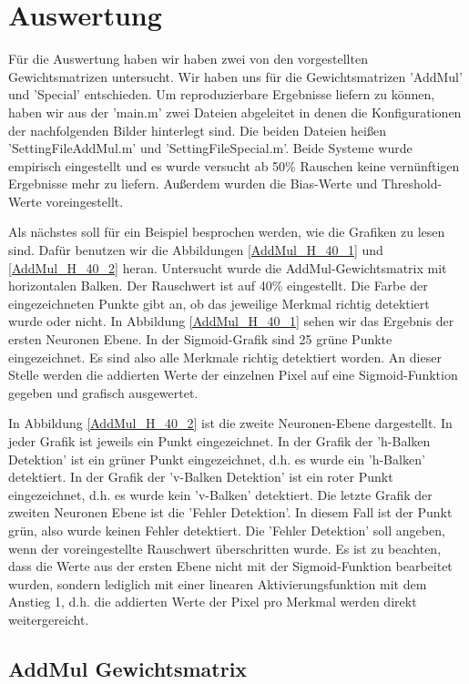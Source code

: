 \newpage
\section{Auswertung}
Für die Auswertung haben wir haben zwei von den vorgestellten Gewichtsmatrizen untersucht. Wir haben uns für die Gewichtsmatrizen 'AddMul' und 'Special' entschieden. Um reproduzierbare Ergebnisse liefern zu können, haben wir aus der 'main.m' zwei Dateien abgeleitet in denen die Konfigurationen der nachfolgenden Bilder hinterlegt sind. Die beiden Dateien heißen 'SettingFileAddMul.m' und 'SettingFileSpecial.m'. Beide Systeme wurde empirisch eingestellt und es wurde versucht ab 50\% Rauschen keine vernünftigen Ergebnisse mehr zu liefern. Außerdem wurden die Bias-Werte und Threshold-Werte voreingestellt.

Als nächstes soll für ein Beispiel besprochen werden, wie die Grafiken zu lesen sind. Dafür benutzen wir die Abbildungen \ref{AddMul_H_40_1} und \ref{AddMul_H_40_2} heran. Untersucht wurde die AddMul-Gewichtsmatrix mit horizontalen Balken. Der Rauschwert ist auf 40\% eingestellt. Die Farbe der eingezeichneten Punkte gibt an, ob das jeweilige Merkmal richtig detektiert wurde oder nicht. In Abbildung \ref{AddMul_H_40_1} sehen wir das Ergebnis der ersten Neuronen Ebene. In der Sigmoid-Grafik sind 25 grüne Punkte eingezeichnet. Es sind also alle Merkmale richtig detektiert worden. An dieser Stelle werden die addierten Werte der einzelnen Pixel auf eine Sigmoid-Funktion gegeben und grafisch ausgewertet.

In Abbildung \ref{AddMul_H_40_2} ist die zweite Neuronen-Ebene dargestellt. In jeder Grafik ist jeweils ein Punkt eingezeichnet. In der Grafik der 'h-Balken Detektion' ist ein grüner Punkt eingezeichnet, d.h. es wurde ein 'h-Balken' detektiert. In der Grafik der 'v-Balken Detektion' ist ein roter Punkt eingezeichnet, d.h. es wurde kein 'v-Balken' detektiert. Die letzte Grafik der zweiten Neuronen Ebene ist die 'Fehler Detektion'. In diesem Fall ist der Punkt grün, also wurde keinen Fehler detektiert. Die 'Fehler Detektion' soll angeben, wenn der voreingestellte Rauschwert überschritten wurde. Es ist zu beachten, dass die Werte aus der ersten Ebene nicht mit der Sigmoid-Funktion bearbeitet wurden, sondern lediglich mit einer linearen Aktivierungsfunktion mit dem Anstieg 1, d.h. die addierten Werte der Pixel pro Merkmal werden direkt weitergereicht.  

\newpage
\subsection{AddMul Gewichtsmatrix}

